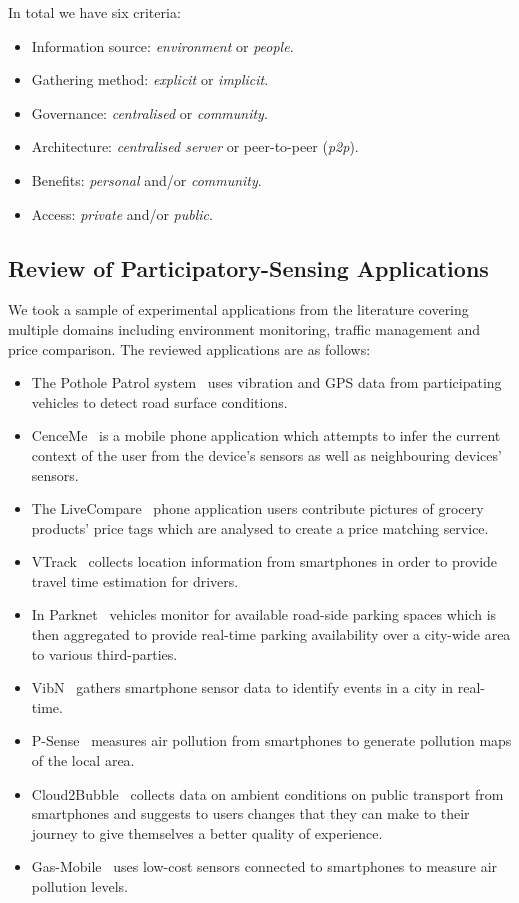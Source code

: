 In total we have six criteria:
\begin{itemize}
\item Information source: \emph{environment} or \emph{people}.
\item Gathering method: \emph{explicit} or \emph{implicit}.
\item Governance: \emph{centralised} or \emph{community}.
\item Architecture: \emph{centralised server} or peer-to-peer (\emph{p2p}).
\item Benefits: \emph{personal} and/or \emph{community}.
\item Access: \emph{private} and/or \emph{public}.
\end{itemize}

\subsection{Review of Participatory-Sensing Applications}

We took a sample of experimental applications from the literature covering multiple domains including environment monitoring, traffic management and price comparison. The reviewed applications are as follows:
\begin{itemize}
\item The Pothole Patrol system~\citep{Eriksson2008} uses vibration and GPS data from participating vehicles to detect road surface conditions.
\item CenceMe~\citep{Miluzzo2008} is a mobile phone application which attempts to infer the current context of the user from the device's sensors as well as neighbouring devices' sensors.
\item The LiveCompare~\citep{Deng2009} phone application users contribute pictures of grocery products' price tags which are analysed to create a price matching service.
\item VTrack~\citep{Thiagarajan2009} collects location information from smartphones in order to provide travel time estimation for drivers.
\item In Parknet~\citep{Mathur2010} vehicles monitor for available road-side parking spaces which is then aggregated to provide real-time parking availability over a city-wide area to various third-parties.
\item VibN~\citep{Miluzzo2011} gathers smartphone sensor data to identify events in a city in real-time.
\item P-Sense~\citep{Mendez2011} measures air pollution from smartphones to generate pollution maps of the local area.
\item Cloud2Bubble~\citep{Costa2012} collects data on ambient conditions on public transport from smartphones and suggests to users changes that they can make to their journey to give themselves a better quality of experience.
\item Gas-Mobile~\citep{Hasenfratz2012} uses low-cost sensors connected to smartphones to measure air pollution levels.
\end{itemize}

